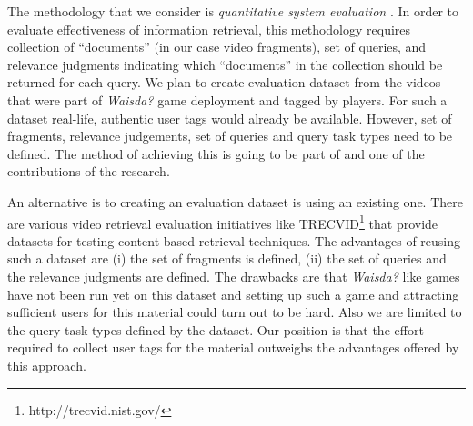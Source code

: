 The methodology that we consider is \textit{quantitative system evaluation} \cite{vorhees}. In order to evaluate effectiveness of information retrieval, this methodology requires collection of ``documents'' (in our case video fragments), set of queries, and relevance judgments  indicating which ``documents'' in the collection should be returned for each query. We plan to create evaluation dataset from the videos that were part of \textit{Waisda?} game deployment and tagged by players. For such a dataset real-life, authentic user tags would already be available. However, set of fragments, relevance judgements, set of queries and query task types need to be defined. The method of achieving this is going to be part of and one of the contributions of the research.
	
An alternative is to creating an evaluation dataset is using an existing one. There are various video retrieval evaluation initiatives like TRECVID\footnote{http://trecvid.nist.gov/} that provide datasets for testing content-based retrieval techniques. The advantages of reusing such a dataset are (i) the set of fragments is defined, (ii) the set of queries and the relevance judgments are defined. The drawbacks are that \textit{Waisda?} like games have not been run yet on this dataset and setting up such a game and attracting sufficient users for this material could turn out to be hard. Also we are limited to the query task types defined by the dataset. Our position is that the effort required to collect user tags for the material outweighs the advantages offered by this approach.
	


